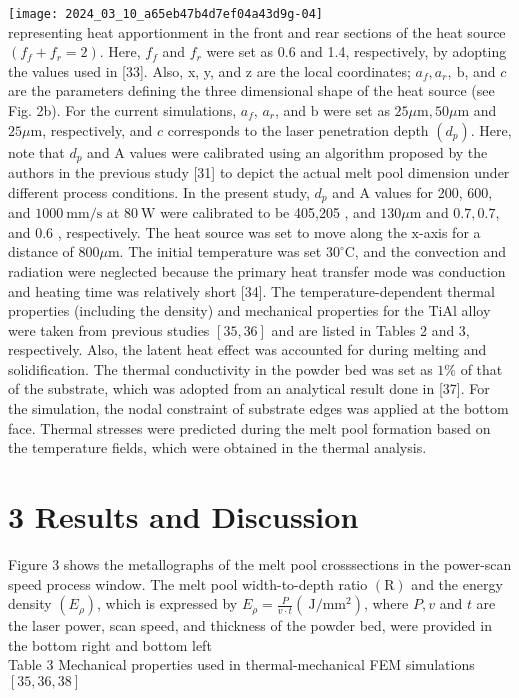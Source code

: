 \documentclass[10pt]{article}
\begin{document}
\texttt{[image: 2024\_03\_10\_a65eb47b4d7ef04a43d9g-04]}\\
representing heat apportionment in the front and rear sections of the heat source $\left(f_{f}+f_{r}=2\right)$. Here, $f_{f}$ and $f_{r}$ were set as 0.6 and 1.4, respectively, by adopting the values used in [33]. Also, x, y, and $\mathrm{z}$ are the local coordinates; $a_{f}, a_{r}, \mathrm{~b}$, and $c$ are the parameters defining the three dimensional shape of the heat source (see Fig. 2b). For the current simulations, $a_{f}$, $a_{r}$, and $\mathrm{b}$ were set as $25 \mu \mathrm{m}, 50 \mu \mathrm{m}$ and $25 \mu \mathrm{m}$, respectively, and $c$ corresponds to the laser penetration depth $\left(d_{p}\right)$. Here, note that $d_{p}$ and $\mathrm{A}$ values were calibrated using an algorithm proposed by the authors in the previous study [31] to depict the actual melt pool dimension under different process conditions. In the present study, $d_{p}$ and A values for 200, 600, and $1000 \mathrm{~mm} / \mathrm{s}$ at $80 \mathrm{~W}$ were calibrated to be 405,205 , and $130 \mu \mathrm{m}$ and $0.7,0.7$, and 0.6 , respectively. The heat source was set to move along the $\mathrm{x}$-axis for a distance of $800 \mu \mathrm{m}$. The initial temperature was set $30^{\circ} \mathrm{C}$, and the convection and radiation were neglected because the primary heat transfer mode was conduction and heating time was relatively short [34]. The temperature-dependent thermal properties (including the density) and mechanical properties for the TiAl alloy were taken from previous studies $[35,36]$ and are listed in Tables 2 and 3, respectively. Also, the latent heat effect was accounted for during melting and solidification. The thermal conductivity in the powder bed was set as $1 \%$ of that of the substrate, which was adopted from an analytical result done in [37]. For the simulation, the nodal constraint of substrate edges was applied at the bottom face. Thermal stresses were predicted during the melt pool formation based on the temperature fields, which were obtained in the thermal analysis.

\section*{3 Results and Discussion}
Figure 3 shows the metallographs of the melt pool crosssections in the power-scan speed process window. The melt pool width-to-depth ratio $(\mathrm{R})$ and the energy density $\left(E_{\rho}\right)$, which is expressed by $E_{\rho}=\frac{P}{v \cdot t}\left(\mathrm{~J} / \mathrm{mm}^{2}\right)$, where $P, v$ and $t$ are the laser power, scan speed, and thickness of the powder bed, were provided in the bottom right and bottom left\\
Table 3 Mechanical properties used in thermal-mechanical FEM simulations $[35,36,38]$
\end{document}
